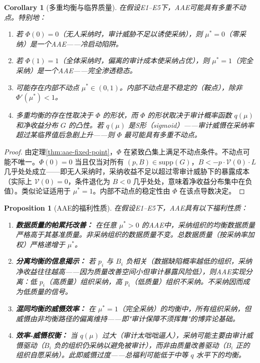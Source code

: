 \documentclass[12pt,a4paper]{ctexart}
\newtheorem{corollary}[theorem]{Corollary}
\newtheorem{proposition}[theorem]{Proposition}
\theoremstyle{definition}
\theoremstyle{remark}
\begin{document}
\begin{corollary}[多重均衡与临界质量]
\label{cor:multiple-aae}
在假设E1--E5下，AAE可能具有多重不动点。特别地：
\begin{enumerate}[label=(\roman*)]
\item 若 $\Phi(0) = 0$（无人采纳时，审计威胁不足以诱使采纳），则 $\mu^* = 0$（零采纳）是一个AAE——冷启动陷阱。
\item 若 $\Phi(1) = 1$（全体采纳时，偏离的审计成本使采纳占优），则 $\mu^* = 1$（完全采纳）是一个AAE——完全渗透稳态。
\item 可能存在内部不动点 $\mu^* \in (0,1)$。内部不动点是不稳定的（鞍点），除非 $\Phi'(\mu^*) < 1$。
\item 多重均衡的存在性取决于 $\Phi$ 的形状，而 $\Phi$ 的形状取决于审计概率函数 $q(\mu)$ 和净收益分布 $G$ 的凸性。若 $q(\mu)$ 是S形（sigmoid）——审计威慑在采纳率超过某临界值后急剧上升——则 $\Phi$ 最可能具有多重不动点。
\end{enumerate}
\end{corollary}

\begin{proof}
由定理\ref{thm:aae-fixed-point}，$\Phi$ 在紧致凸集上满足不动点条件。不动点可能不唯一。$\Phi(0) = 0$ 当且仅当对所有 $(p, B) \in \text{supp}(G)$，$B < -p \cdot \mathcal{V}(0) \cdot L$ 几乎处处成立——即无人采纳时，采纳收益不足以超过零审计威胁下的暴露成本（实际上 $\mathcal{V}(0) = 0$，条件退化为 $B < 0$ 几乎处处，意味着净收益分布集中在负值）。类似论证适用于 $\mu^* = 1$。内部不动点的稳定性由 $\Phi$ 在该点导数决定。
\end{proof}

\begin{proposition}[AAE的福利性质]
\label{prop:aae-welfare}
在假设E1--E5下，AAE具有以下福利性质：
\begin{enumerate}[label=(\roman*)]
\item \textbf{数据质量的帕累托改善：} 在任意 $\mu^* > 0$ 的AAE中，采纳组织的均衡数据质量严格高于其基准质量。非采纳组织的数据质量不变。总数据质量（按采纳率加权）严格递增于 $\mu^*$。
\item \textbf{分离均衡的信息揭示：} 若 $p_i$ 与 $B_i$ 负相关（数据缺陷概率越低的组织，采纳净收益往往越高——因为质量改善空间小但审计暴露风险低），则AAE实现\textit{分离}：低 $p_i$（高质量）组织采纳，高 $p_i$（低质量）组织不采纳。不采纳因而成为低质量的信号。
\item \textbf{混同均衡的威慑效率：} 在 $\mu^* = 1$（完全采纳）的均衡中，所有组织采纳，但威慑由非均衡路径的偏离维持——即"审计保障不须挥舞"的博弈论基础。
\item \textbf{效率-威慑权衡：} 当 $q(\mu)$ 过大（审计太咄咄逼人），采纳可能主要由审计威慑驱动（$B_i$ 负的组织仍采纳以避免被审计），而非由质量改善驱动（$B_i$ 正的组织自愿采纳）。此即\textit{威慑过度}——总福利可能低于中等 $q$ 水平下的均衡。
\end{enumerate}
\end{proposition}
\end{document}
